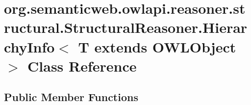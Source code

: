 \hypertarget{classorg_1_1semanticweb_1_1owlapi_1_1reasoner_1_1structural_1_1_structural_reasoner_1_1_hierarch7d8ade138c58c437609a51314b153fe1}{\section{org.\-semanticweb.\-owlapi.\-reasoner.\-structural.\-Structural\-Reasoner.\-Hierarchy\-Info$<$ T extends O\-W\-L\-Object $>$ Class Reference}
\label{classorg_1_1semanticweb_1_1owlapi_1_1reasoner_1_1structural_1_1_structural_reasoner_1_1_hierarch7d8ade138c58c437609a51314b153fe1}
}
\subsection*{Public Member Functions}
